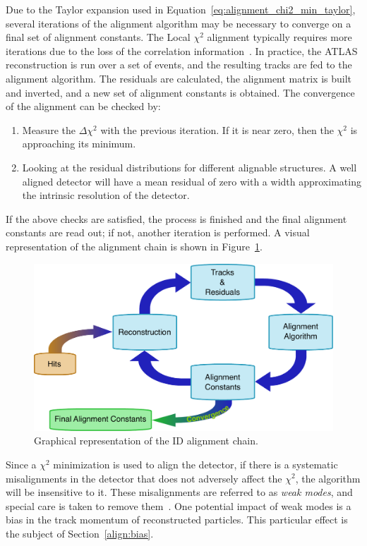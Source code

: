 Due to the Taylor expansion used in Equation~\ref{eq:alignment_chi2_min_taylor}, several iterations of the alignment algorithm may be necessary to converge on a final set of alignment constants.
The Local $\chi^2$ alignment typically requires more iterations due to the loss of the correlation information~\cite{2007.alignment-strategy}.
In practice, the ATLAS reconstruction is run over a set of events, and the resulting tracks are fed to the alignment algorithm.
The residuals are calculated, the alignment matrix is built and inverted, and a new set of alignment constants is obtained.
The convergence of the alignment can be checked by:
\begin{enumerate}
\item Measure the $\Delta\chi^2$ with the previous iteration. If it is near zero, then the $\chi^2$ is approaching its minimum.
\item Looking at the residual distributions for different alignable structures. A well aligned detector will have a mean residual of zero with a width approximating the intrinsic resolution of the detector.
\end{enumerate}
If the above checks are satisfied, the process is finished and the final alignment constants are read out; if not, another iteration is performed.
A visual representation of the alignment chain is shown in Figure~\ref{fig:alignment_chain}.

\begin{figure}[htbp]
  \centering
  \includegraphics[width=.8\textwidth]{figs/alignment/alignment-chain}
  \caption{Graphical representation of the ID alignment chain.}
  \label{fig:alignment_chain}
\end{figure}

Since a $\chi^2$ minimization is used to align the detector, if there is a systematic misalignments in the detector that does not adversely affect the $\chi^2$, the algorithm will be insensitive to it.
These misalignments are referred to as \emph{weak modes}, and special care is taken to remove them~\cite{2014.alignment-performance-8tev}.
One potential impact of weak modes is a bias in the track momentum of reconstructed particles.
This particular effect is the subject of Section~\ref{align:bias}.

